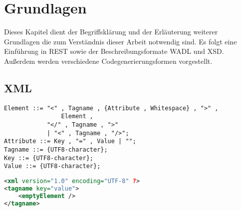\chapter{Grundlagen}


Dieses Kapitel dient der Begriffsklärung und der Erläuterung weiterer Grundlagen die zum Verständnis dieser Arbeit notwendig sind. Es folgt eine Einführung in \gls{REST} sowie der Beschreibungsformate \gls{WADL} und \gls{XSD}. Außerdem werden verschiedene Codegenerierungsformen vorgestellt.

\section{XML}


\begin{lstlisting}[caption="EBNF eines XML-Elementes"]
Element ::= "<" , Tagname , {Attribute , Whitespace} , ">" ,  
                Element , 
            "</" , Tagname , ">" 
            | "<" , Tagname , "/>";
Attribute ::= Key , "=" , Value | "";
Tagname ::= {UTF8-character};
Key ::= {UTF8-character};
Value ::= {UTF8-character};
\end{lstlisting}

\begin{lstlisting}[language=XML, caption="Minimalbeispiel für eine XML-Datei"]
<xml version="1.0" encoding="UTF-8" ?>
<tagname key="value">
    <emptyElement />
</tagname>
\end{lstlisting}







